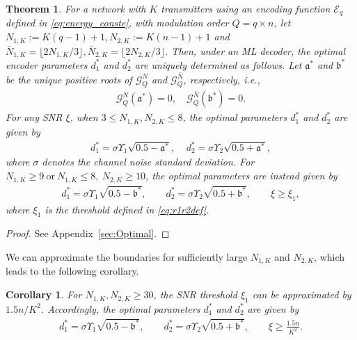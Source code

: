 \documentclass[journal,12pt,onecolumn,draftclsnofoot]{IEEEtran}
\newtheorem{theorem}{Theorem}
\newtheorem{cor}{Corollary}
\theoremstyle{definition}
\begin{document}
\begin{theorem}\label{th:Optmizaiton}
    For a network with $K$ transmitters using an encoding function $\mathscr{E}_{q}$ defined in \eqref{eq:energy_conste}, with  modulation order $Q=q\times n$, let $N_{1,K}:= K(q-1)+1, N_{2,K}:= K(n-1)+1$ and $\bar{N}_{1,K}=\lfloor 2N_{1,K}/3\rfloor, \bar{N}_{2,K}=\lfloor 2N_{2,K}/3\rfloor$.   Then, under an ML decoder, the optimal encoder parameters ${d}_1^*$ and ${d}_2^*$ are uniquely determined as follows. Let $\mathfrak{a}^{*}$ and $\mathfrak{b}^{*}$ be the unique positive roots of $\mathcal{G}_{Q}^{N}$ and $\mathcal{G}_{Q}^{\bar{N}}$, respectively, i.e., 
    \begin{align}
        \label{eq:uniqeg0}
         \mathcal{G}_{Q}^{N}(\mathfrak{a}^{*}) =0,\quad  \mathcal{G}_{Q}^{\bar{N}}(\mathfrak{b}^{*}) =0.
    \end{align}
    For any SNR $\xi$, when $3\leq N_{1,K}, N_{2,K} \leq8$,  the optimal parameters ${d}_1^*$ and ${d}_2^*$ are given by
    \begin{align}
        \label{eq:uniqegn}
        {d}_1^* = \sigma \Upsilon_1\sqrt{0.5- \mathfrak{a}^{*}},~~~~~{d}_2^* = \sigma \Upsilon_2\sqrt{0.5+\mathfrak{a}^{*}},
    \end{align}
    where $\sigma$ denotes the channel noise standard deviation. For $N_{1,K}\geq 9~\text{or}~ N_{1, K}\leq 8,~N_{2, K}\geq 10$, the optimal parameters are instead given by
        \begin{align}\label{eq:uniqeg(2)}
      {d}_1^* = \sigma \Upsilon_1\sqrt{0.5-\mathfrak{b}^{*}}, 
      \qquad 
  {d}_2^* = \sigma \Upsilon_2\sqrt{0.5+\mathfrak{b}^{*}}, \qquad  \xi \geq {\xi}_1,
    \end{align} 
where $\xi_1$ is the threshold defined in \eqref{eq:r1r2def}.  
\end{theorem}
\begin{proof}
    See Appendix~\ref{sec:Optimal}.
\end{proof}
We can approximate the boundaries for sufficiently large  $N_{1, K}$ and $N_{2, K}$, which leads to the following corollary.
\begin{cor}
    For $N_{1,K}, N_{2,K}\geq 30$, the SNR threshold $\xi_1$ can be approximated by $1.5n/K^2$. Accordingly, the optimal parameters ${d}_1^*$ and ${d}_2^*$  are given by
        \begin{align}\label{eq:uniqeg(2)-aprox}
      {d}_1^* = \sigma \Upsilon_1\sqrt{0.5-\mathfrak{b}^{*}}, %
   \qquad
  {d}_2^* = \sigma \Upsilon_2\sqrt{0.5+\mathfrak{b}^{*}}, \qquad  \xi \geq \frac{1.5n}{K^2}.
    \end{align}
\end{cor}
\end{document}
